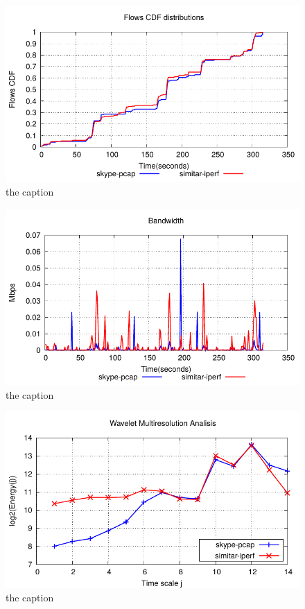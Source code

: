 \begin{figure}[!ht]
	\centering
	\includegraphics[]{figures/ch5/iperfFlowCdf.pdf}
	\caption{the caption}
	\label{fig:iperfFlowCdf}
\end{figure}

\begin{figure}[!ht]
	\centering
	\includegraphics[]{figures/ch5/iperfBandwidth.pdf}
	\caption{the caption}
	\label{fig:iperfBandwidth}
\end{figure}

\begin{figure}[!ht]
	\centering
	\includegraphics[]{figures/ch5/iperfWaveletMREA.pdf}
	\caption{the caption}
	\label{fig:iperfWaveletMREA}
\end{figure}


